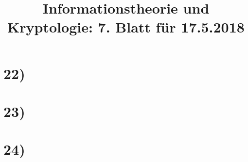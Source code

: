 %



  \title{Informationstheorie und Kryptologie: 7. Blatt für 17.5.2018}
  \maketitle

  \section*{22)}

  

  \section*{23)}

  \section*{24)}

